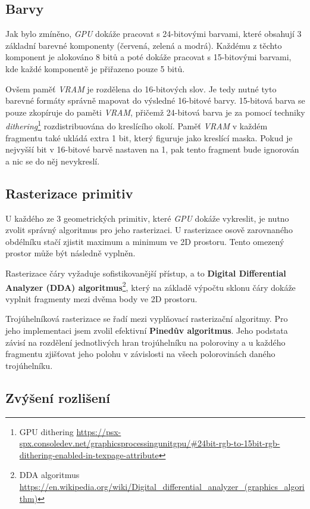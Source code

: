 \subsection{Barvy}

Jak bylo zmíněno, \textit{GPU} dokáže pracovat s 24-bitovými barvami, které obsahují 3 základní barevné komponenty (červená, zelená a modrá). 
Každému z těchto komponent je alokováno 8 bitů a poté dokáže pracovat s 15-bitovými barvami, kde každé komponentě je přiřazeno pouze 5 bitů.

Ovšem paměť \textit{VRAM} je rozdělena do 16-bitových slov. Je tedy nutné tyto barevné formáty správně mapovat do výsledné 16-bitové barvy. 
15-bitová barva se pouze zkopíruje do paměti \textit{VRAM}, přičemž 24-bitová barva je za pomocí techniky \textit{dithering}\footnote{GPU dithering\cite{PSXSpec} \url{https://psx-spx.consoledev.net/graphicsprocessingunitgpu/\#24bit-rgb-to-15bit-rgb-dithering-enabled-in-texpage-attribute}} rozdistribuována do kreslícího okolí. 
Paměť \textit{VRAM} v každém fragmentu také ukládá extra 1 bit, který figuruje jako kreslící maska. 
Pokud je nejvyšší bit v 16-bitové barvě nastaven na 1, pak tento fragment bude ignorován a nic se do něj nevykreslí.

\subsection{Rasterizace primitiv}

U každého ze 3 geometrických primitiv, které \textit{GPU} dokáže vykreslit, je nutno zvolit správný algoritmus pro jeho rasterizaci.
U rasterizace osově zarovnaného obdélníku stačí zjistit maximum a minimum ve 2D prostoru. Tento omezený prostor může být následně vyplněn.

Rasterizace čáry vyžaduje sofistikovanější přístup, a to \textbf{Digital Differential Analyzer (DDA) algoritmus}\footnote{DDA algoritmus \url{https://en.wikipedia.org/wiki/Digital_differential_analyzer_(graphics_algorithm)}}, 
který na základě výpočtu sklonu čáry dokáže vyplnit fragmenty mezi dvěma body ve 2D prostoru.

Trojúhelníková rasterizace se řadí mezi vyplňovací rasterizační algoritmy. 
Pro jeho implementaci jsem zvolil efektivní \textbf{Pinedův algoritmus}\cite{PinedaAlgorithm}. 
Jeho podstata závisí na rozdělení jednotlivých hran trojúhelníku na poloroviny a u každého fragmentu zjišťovat jeho 
polohu v závislosti na všech polorovinách daného trojúhelníku.

\subsection{Zvýšení rozlišení}

